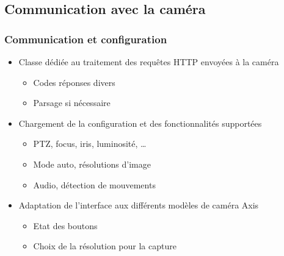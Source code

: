 \subsection{Communication avec la caméra}
  \begin{frame}
   \frametitle{Communication et configuration}

  \begin{minipage}{0.94\textwidth}
  \centering
     \begin{itemize}
    \item Classe dédiée au traitement des requêtes HTTP envoyées à la caméra
    \begin{itemize}
      \item Codes réponses divers
      \item Parsage si nécessaire
      \newline
    \end{itemize}
    \item Chargement de la configuration et des fonctionnalités supportées
    \begin{itemize}
      \item PTZ, focus, iris, luminosité, \ldots
      \item Mode auto, résolutions d'image
      \item Audio, détection de mouvements
      \newline
    \end{itemize}
    \item Adaptation de l'interface aux différents modèles de caméra Axis
    \begin{itemize}
      \item Etat des boutons
      \item Choix de la résolution pour la capture
      \newline
    \end{itemize}
   	\end{itemize}
  \end{minipage}

  \end{frame}
